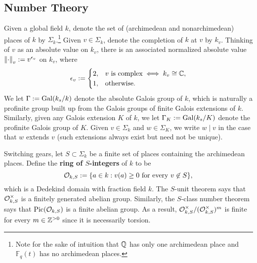 \documentclass[11pt]{article}
\begin{document}
\subsection{Number Theory}
Given a global field $k$, denote the set of (archimedean and nonarchimedean) places of $k$ by $\Sigma_k$.\footnote{Note for the sake of intuition that $\mathbb{Q}$ has only one archimedean place and $\mathbb{F}_q(t)$ has no archimedean places.} Given $v\in \Sigma_k$, denote the completion of $k$ at $v$ by $k_v$. Thinking of $v$ as an absolute value on $k_v$, there is an associated normalized absolute value $\left\lVert\cdot\right\rVert_v:=v^{\epsilon_v}$ on $k_v$, where
\begin{equation*}
\epsilon_v:=
\begin{cases}
2, & v\textrm{ is complex}\iff k_v\cong\mathbb{C}, \\
1, & \textrm{otherwise}.
\end{cases}
\end{equation*} 
We let $\Gamma:=\operatorname{Gal}(k_s/k)$ denote the absolute Galois group of $k$, which is naturally a profinite group built up from the Galois groups of finite Galois extensions of $k$. Similarly, given any Galois extension $K$ of $k$, we let $\Gamma_K:=\operatorname{Gal}(k_s/K)$ denote the profinite Galois group of $K$. Given $v\in\Sigma_k$ and $w\in\Sigma_K$, we write $w\mid v$ in the case that $w$ extends $v$ (such extensions always exist but need not be unique). 

Switching gears, let $S\subset\Sigma_k$ be a finite set of places containing the archimedean places. Define the \textbf{ring of $S$-integers} of $k$ to be 
$$\mathcal{O}_{k,S}:=\{a\in k : v(a)\geq0\textrm{ for every }v\not\in S\},$$
which is a Dedekind domain with fraction field $k$. The $S$-unit theorem says that $\mathcal{O}_{k,S}^{\times}$ is a finitely generated abelian group. Similarly, the $S$-class number theorem says that $\operatorname{Pic}(\mathcal{O}_{k,S})$ is a finite abelian group. As a result, $\mathcal{O}_{k,S}^{\times}/(\mathcal{O}_{k,S}^{\times})^m$ is finite for every $m\in\mathbb{Z}^{>0}$ since it is necessarily torsion.
\end{document}
